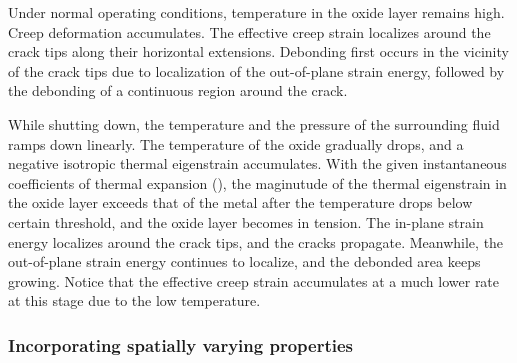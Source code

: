 

Under normal operating conditions, temperature in the oxide layer remains high. Creep deformation accumulates. The effective creep strain localizes around the crack tips along their horizontal extensions. Debonding first occurs in the vicinity of the crack tips due to localization of the out-of-plane strain energy, followed by the debonding of a continuous region around the crack.



While shutting down, the temperature and the pressure of the surrounding fluid ramps down linearly. The temperature of the oxide gradually drops, and a negative isotropic thermal eigenstrain accumulates. With the given instantaneous coefficients of thermal expansion (), the maginutude of the thermal eigenstrain in the oxide layer exceeds that of the metal after the temperature drops below certain threshold, and the oxide layer becomes in tension. The in-plane strain energy localizes around the crack tips, and the cracks propagate. Meanwhile, the out-of-plane strain energy continues to localize, and the debonded area keeps growing. Notice that the effective creep strain accumulates at a much lower rate at this stage due to the low temperature.

\subsubsection{Incorporating spatially varying properties}

